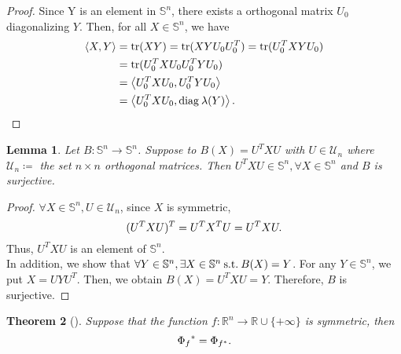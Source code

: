 \documentclass[a4paper,11pt, oneside]{book}
\newtheorem{thm}{Theorem}[section]
\newtheorem{lem}[thm]{Lemma}
\theoremstyle{definition}
\newcommand{\RealNumberSet}{\mathbb{R}}
\newcommand{\NDemenstionalRealEuclideanSpace}{\mathbb{R}^n}
\newcommand{\NDemenstionalRealSymmetricMatrixSpace}{\mathbb{S}^n}
\newcommand{\NDemenstionalRealOthonormalMatrixSpace}{\mathcal{U}_n}
\newcommand{\Trace}[1]{\text{\rm tr$({#1})$}} %
\newcommand{\Diagnosis}[1]{\text{\rm diag\:${#1}$}} %
\newcommand{\InnerProduct}[2]{\left\langle {#1},{#2}\right\rangle} %
\newcommand{\ExtendedRealValuedFunction}[2]{{#1}: {#2} \to \RealNumberSet \cup \{+\infty\}}
\newcommand{\SuchThat}{\:\text{\rm s.t.}\:}
\begin{document}
\begin{proof}
  Since Y is an element in $\NDemenstionalRealSymmetricMatrixSpace$, there exists a orthogonal matrix $U_0$ diagonalizing $Y$. Then, for all $X \in \NDemenstionalRealSymmetricMatrixSpace$, we have
  \begin{equation}
    \begin{split}
      \InnerProduct{X}{Y} &= \Trace{XY} = \Trace{XYU_0U_0^T} = \Trace{U_0^TXYU_0} \\
      &= \Trace{U_0^TXU_0U_0^TYU_0}\\
      &= \InnerProduct{U_0^TXU_0}{U_0^TYU_0}\\
      &= \InnerProduct{U_0^TXU_0}{\Diagnosis{\lambda (Y)}}. \notag
    \end{split}
  \end{equation}
\end{proof}

\begin{lem}\label{lemma2ForLewis96}
  Let $B: \NDemenstionalRealSymmetricMatrixSpace \to \NDemenstionalRealSymmetricMatrixSpace$. Suppose to $B(X) = U^TXU$ with $U \in \NDemenstionalRealOthonormalMatrixSpace$ where $\NDemenstionalRealOthonormalMatrixSpace \coloneqq$ the set $n \times n$ orthogonal matrices. Then $U^TXU \in \NDemenstionalRealSymmetricMatrixSpace, \forall X \in \NDemenstionalRealSymmetricMatrixSpace$ and $B$ is surjective.
\end{lem}

\begin{proof}
  $\forall X \in \NDemenstionalRealSymmetricMatrixSpace, U \in \NDemenstionalRealOthonormalMatrixSpace$, since $X$ is symmetric,
  \begin{equation}
    (U^TXU)^T = U^TX^TU = U^TXU. \notag
  \end{equation}
  Thus, $U^TXU$ is an element of $\NDemenstionalRealSymmetricMatrixSpace$. \\
  In addition, we show that  $\forall Y \in \NDemenstionalRealSymmetricMatrixSpace, \exists X \in \NDemenstionalRealSymmetricMatrixSpace \SuchThat B(X) = Y$. For any $Y \in \NDemenstionalRealSymmetricMatrixSpace$, we put $X = UYU^T$. Then, we obtain $B(X) = U^TXU = Y$. Therefore, $B$ is surjective.
\end{proof}

\begin{thm}[\mbox{\cite[Lewis (1996)]{Lewis96}}]\label{Lewis96}
  Suppose that the function $\ExtendedRealValuedFunction{f}{\NDemenstionalRealEuclideanSpace}$ is symmetric, then
  \begin{equation}
    {\Phi_{f}}^* = \Phi_{f^*}. \notag
  \end{equation}
\end{thm}
\end{document}
